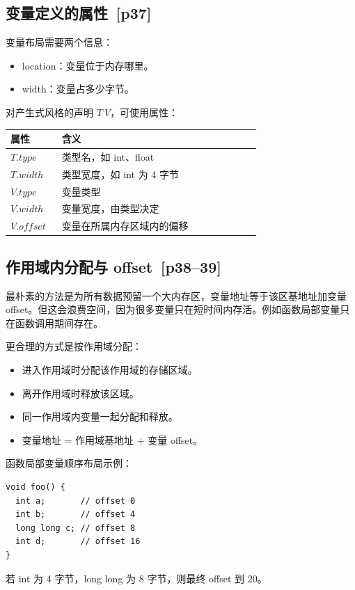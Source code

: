 \documentclass[UTF8,fontset=none,11pt]{ctexart}
\newcommand{\pg}[1]{\texorpdfstring{{\small\color{graytext}\,[p#1]}}{ [p#1]}}
\begin{document}
\subsection{变量定义的属性 \pg{37}}

变量布局需要两个信息：

\begin{itemize}
  \item location：变量位于内存哪里。
  \item width：变量占多少字节。
\end{itemize}

对产生式风格的声明 \(T\ V\)，可使用属性：

\begin{longtable}{L{0.18\linewidth}L{0.70\linewidth}}
\toprule
属性 & 含义 \\
\midrule
\(T.type\) & 类型名，如 int、float \\
\(T.width\) & 类型宽度，如 int 为 4 字节 \\
\(V.type\) & 变量类型 \\
\(V.width\) & 变量宽度，由类型决定 \\
\(V.offset\) & 变量在所属内存区域内的偏移 \\
\bottomrule
\end{longtable}

\subsection{作用域内分配与 offset \pg{38--39}}

最朴素的方法是为所有数据预留一个大内存区，变量地址等于该区基地址加变量 offset。但这会浪费空间，因为很多变量只在短时间内存活。例如函数局部变量只在函数调用期间存在。

更合理的方式是按作用域分配：

\begin{itemize}
  \item 进入作用域时分配该作用域的存储区域。
  \item 离开作用域时释放该区域。
  \item 同一作用域内变量一起分配和释放。
  \item 变量地址 = 作用域基地址 + 变量 offset。
\end{itemize}

函数局部变量顺序布局示例：
\begin{verbatim}
void foo() {
  int a;       // offset 0
  int b;       // offset 4
  long long c; // offset 8
  int d;       // offset 16
}
\end{verbatim}
若 int 为 4 字节，long long 为 8 字节，则最终 offset 到 20。
\end{document}
